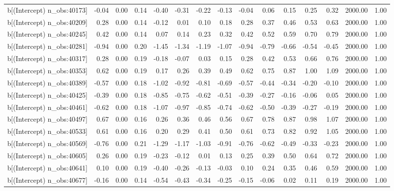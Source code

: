 \begin{table}[ht]
\begin{tabular}{rrrrrrrrrrrrrrr}
  b[(Intercept) n\_obs:40173] & -0.04 & 0.00 & 0.14 & -0.40 & -0.31 & -0.22 & -0.13 & -0.04 & 0.06 & 0.15 & 0.25 & 0.32 & 2000.00 & 1.00 \\ 
  b[(Intercept) n\_obs:40209] & 0.28 & 0.00 & 0.14 & -0.12 & 0.01 & 0.10 & 0.18 & 0.28 & 0.37 & 0.46 & 0.53 & 0.63 & 2000.00 & 1.00 \\ 
  b[(Intercept) n\_obs:40245] & 0.42 & 0.00 & 0.14 & 0.07 & 0.14 & 0.23 & 0.32 & 0.42 & 0.52 & 0.59 & 0.70 & 0.79 & 2000.00 & 1.00 \\ 
  b[(Intercept) n\_obs:40281] & -0.94 & 0.00 & 0.20 & -1.45 & -1.34 & -1.19 & -1.07 & -0.94 & -0.79 & -0.66 & -0.54 & -0.45 & 2000.00 & 1.00 \\ 
  b[(Intercept) n\_obs:40317] & 0.28 & 0.00 & 0.19 & -0.18 & -0.07 & 0.03 & 0.15 & 0.28 & 0.42 & 0.53 & 0.66 & 0.76 & 2000.00 & 1.00 \\ 
  b[(Intercept) n\_obs:40353] & 0.62 & 0.00 & 0.19 & 0.17 & 0.26 & 0.39 & 0.49 & 0.62 & 0.75 & 0.87 & 1.00 & 1.09 & 2000.00 & 1.00 \\ 
  b[(Intercept) n\_obs:40389] & -0.57 & 0.00 & 0.18 & -1.02 & -0.92 & -0.81 & -0.69 & -0.57 & -0.44 & -0.34 & -0.20 & -0.10 & 2000.00 & 1.00 \\ 
  b[(Intercept) n\_obs:40425] & -0.39 & 0.00 & 0.18 & -0.85 & -0.75 & -0.62 & -0.51 & -0.39 & -0.27 & -0.16 & -0.06 & 0.05 & 2000.00 & 1.00 \\ 
  b[(Intercept) n\_obs:40461] & -0.62 & 0.00 & 0.18 & -1.07 & -0.97 & -0.85 & -0.74 & -0.62 & -0.50 & -0.39 & -0.27 & -0.19 & 2000.00 & 1.00 \\ 
  b[(Intercept) n\_obs:40497] & 0.67 & 0.00 & 0.16 & 0.26 & 0.36 & 0.46 & 0.56 & 0.67 & 0.78 & 0.87 & 0.98 & 1.07 & 2000.00 & 1.00 \\ 
  b[(Intercept) n\_obs:40533] & 0.61 & 0.00 & 0.16 & 0.20 & 0.29 & 0.41 & 0.50 & 0.61 & 0.73 & 0.82 & 0.92 & 1.05 & 2000.00 & 1.00 \\ 
  b[(Intercept) n\_obs:40569] & -0.76 & 0.00 & 0.21 & -1.29 & -1.17 & -1.03 & -0.91 & -0.76 & -0.62 & -0.49 & -0.33 & -0.23 & 2000.00 & 1.00 \\ 
  b[(Intercept) n\_obs:40605] & 0.26 & 0.00 & 0.19 & -0.23 & -0.12 & 0.01 & 0.13 & 0.25 & 0.39 & 0.50 & 0.64 & 0.72 & 2000.00 & 1.00 \\ 
  b[(Intercept) n\_obs:40641] & 0.10 & 0.00 & 0.19 & -0.40 & -0.26 & -0.13 & -0.03 & 0.10 & 0.24 & 0.35 & 0.46 & 0.59 & 2000.00 & 1.00 \\ 
  b[(Intercept) n\_obs:40677] & -0.16 & 0.00 & 0.14 & -0.54 & -0.43 & -0.34 & -0.25 & -0.15 & -0.06 & 0.02 & 0.11 & 0.19 & 2000.00 & 1.00 \\ 

\end{tabular}
\end{table}
